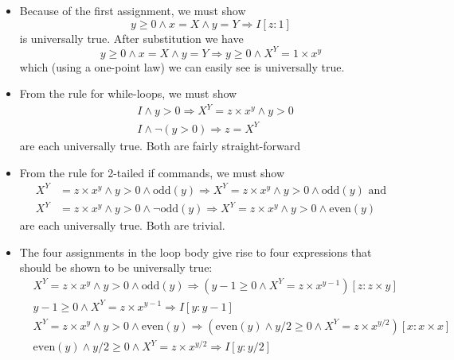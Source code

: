 \documentclass[muchmore,11pt]{article}%
\begin{document}
\begin{itemize}
\item Because of the first assignment, we must show%
\[
y\geq0\wedge x=X\wedge y=Y\Rightarrow I[z:1]
\]
is universally true. After substitution we have%
\[
y\geq0\wedge x=X\wedge y=Y\Rightarrow y\geq0\wedge X^{Y}=1\times x^{y}%
\]
which (using a one-point law) we can easily see is universally true.

\item From the rule for while-loops, we must show%
\begin{align*}
&  I\wedge y>0\Rightarrow X^{Y}=z\times x^{y}\wedge y>0\\
&  I\wedge\lnot\left(  y>0\right)  \Rightarrow z=X^{Y}%
\end{align*}
are each universally true. Both are fairly straight-forward

\item From the rule for 2-tailed if commands, we must show%
\begin{align*}
X^{Y}  &  =z\times x^{y}\wedge y>0\wedge\mathrm{odd}(y)\Rightarrow
X^{Y}=z\times x^{y}\wedge y>0\wedge\mathrm{odd}(y)\text{ and}\\
X^{Y}  &  =z\times x^{y}\wedge y>0\wedge\lnot\mathrm{odd}(y)\Rightarrow
X^{Y}=z\times x^{y}\wedge y>0\wedge\mathrm{even}(y)
\end{align*}
are each universally true. Both are trivial.

\item The four assignments in the loop body give rise to four expressions that
should be shown to be universally true:%
\begin{align*}
&  \left.  X^{Y}=z\times x^{y}\wedge y>0\wedge\mathrm{odd}(y)\right.
\Rightarrow\left(  y-1\geq0\wedge X^{Y}=z\times x^{y-1}\right)  [z:z\times
y]\\
&  \left.  y-1\geq0\wedge X^{Y}=z\times x^{y-1}\right.  \Rightarrow I[y:y-1]\\
&  \left.  X^{Y}=z\times x^{y}\wedge y>0\wedge\mathrm{even}(y)\right.
\Rightarrow\left(  \mathrm{even}(y)\wedge y/2\geq0\wedge X^{Y}=z\times
x^{y/2}\right)  [x:x\times x]\\
&  \left.  \mathrm{even}(y)\wedge y/2\geq0\wedge X^{Y}=z\times x^{y/2}\right.
\Rightarrow I[y:y/2]
\end{align*}

\end{itemize}



\end{document}
